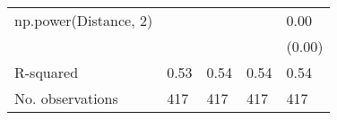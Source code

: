 \begin{table}
\begin{center}
\begin{tabular}{lllll}
np.power(Distance, 2) &                 &                      &                               & 0.00                \\
                      &                 &                      &                               & (0.00)              \\
R-squared             & 0.53            & 0.54                 & 0.54                          & 0.54                \\
No. observations      & 417             & 417                  & 417                           & 417                 \\
\hline
\end{tabular}
\end{center}
\end{table}